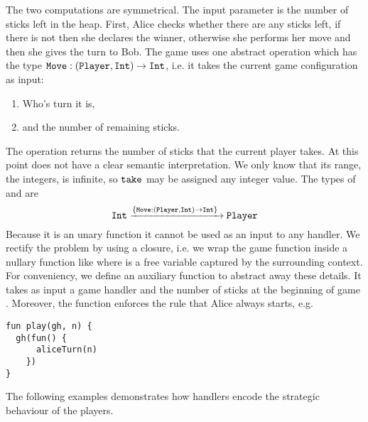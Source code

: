 The two computations are symmetrical. The input parameter  is the number of sticks left in the heap. First, Alice checks whether there are any sticks left, if there is not then she declares  the winner, otherwise she performs her move and then she gives the turn to Bob.
The game uses one abstract operation  which has the type $\texttt{Move} : (\texttt{Player}, \texttt{Int}) \to \texttt{Int}$, i.e. it takes the current game configuration as input:
\begin{enumerate}
  \item Who's turn it is,
  \item and the number of remaining sticks.
\end{enumerate} 
The operation  returns the number of sticks that the current player takes. At this point  does not have a clear semantic interpretation. We only know that its range, the integers, is infinite, so $\texttt{take}$ may be assigned any integer value.
The types of  and  are
\[ \texttt{Int} \xrightarrow{\{\texttt{Move}:(\texttt{Player},\texttt{Int}) \to \texttt{Int}\}\;} \texttt{Player} \]
Because it is an unary function it cannot be used as an input to any handler. We rectify the problem by using a closure, i.e. we wrap the game function inside a nullary function like  where  is a free variable captured by the surrounding context.
For conveniency, we define an auxiliary function  to abstract away these details. It takes as input a game handler  and the number of sticks at the beginning of game . Moreover, the function  enforces the rule that Alice always starts, e.g.
\begin{lstlisting}[style=links]
fun play(gh, n) {
  gh(fun() {
      aliceTurn(n)
    })
}
\end{lstlisting}
The following examples demonstrates how handlers encode the strategic behaviour of the players.
